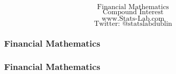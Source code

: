 \documentclass{beamer}
\begin{document}
\begin{frame}

{
\Huge
\[\mbox{Financial Mathematics}\]
\huge
\[\mbox{Compound Interest}\]
}
{
\Large
\[\mbox{www.Stats-Lab.com}\]
\[\mbox{Twitter: @statslabdublin}\]
}
\end{frame}

\begin{frame}
\frametitle{Financial Mathematics}

\end{frame}
\begin{frame}
\frametitle{Financial Mathematics}

\end{frame}
\end{document}
